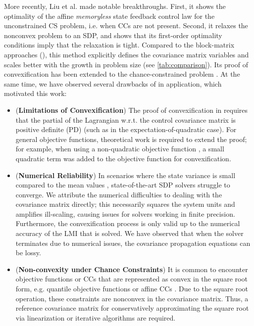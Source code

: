 More recently, Liu et al. \cite{liuOptimalCovarianceSteering2025} made notable breakthroughs. First, it shows the optimality of the affine \textit{memoryless} state feedback control law for the unconstrained CS problem, i.e. when CCs are not present. Second, it relaxes the nonconvex problem to an SDP, and shows that its first-order optimality conditions imply that the relaxation is tight. Compared to the block-matrix approaches (\cite{skafDesignAffineControllers2010,okamotoOptimalCovarianceControl2018,okamotoOptimalStochasticVehicle2019}), this method explicitly defines the covariance matrix variables and scales better with the growth in problem size (see \cref{tab:comparison}). Its proof of convexification has been extended to the chance-constrained problem \cite{rapakouliasDiscreteTimeOptimalCovariance2023}. 
At the same time, we have observed several drawbacks of \cite{liuOptimalCovarianceSteering2025} in application, which motivated this work: 
\begin{itemize}
\item (\textbf{Limitations of Convexification}) The proof of convexification in \cite{liuOptimalCovarianceSteering2025} requires that the partial of the Lagrangian w.r.t. the control covariance matrix is positive definite (PD) (such as in the expectation-of-quadratic case). For general objective functions, theoretical work is required to extend the proof; for example, when using a non-quadratic objective function \cite{kumagaiRobustCislunarLowThrust2025}, a small quadratic term was added to the objective function for convexification.
	
\item (\textbf{Numerical Reliability}) In scenarios where the state variance is small compared to the mean values \cite{oguriChanceConstrainedControlSafe2024a,kumagaiRobustCislunarLowThrust2025}, state-of-the-art SDP solvers struggle to converge. We attribute the numerical difficulties to dealing with the covariance matrix directly; this necessarily squares the system units and amplifies ill-scaling, causing issues for solvers working in finite precision. Furthermore, the convexification process is only valid up to the numerical accuracy of the LMI that is solved. We have observed that when the solver terminates due to numerical issues, the covariance propagation equations can be lossy.

\item (\textbf{Non-convexity under Chance Constraints}) 
It is common to encounter objective functions or CCs that are represented as convex in the square root form, e.g. quantile objective functions or affine CCs \cite{okamotoOptimalCovarianceControl2018}. Due to the square root operation, these constraints are nonconvex in the covariance matrix.
Thus, a reference covariance matrix for conservatively approximating the square root via linearization \cite{rapakouliasDiscreteTimeOptimalCovariance2023} or iterative algorithms \cite{pilipovskyComputationallyEfficientChance2024} are required.
\end{itemize}

